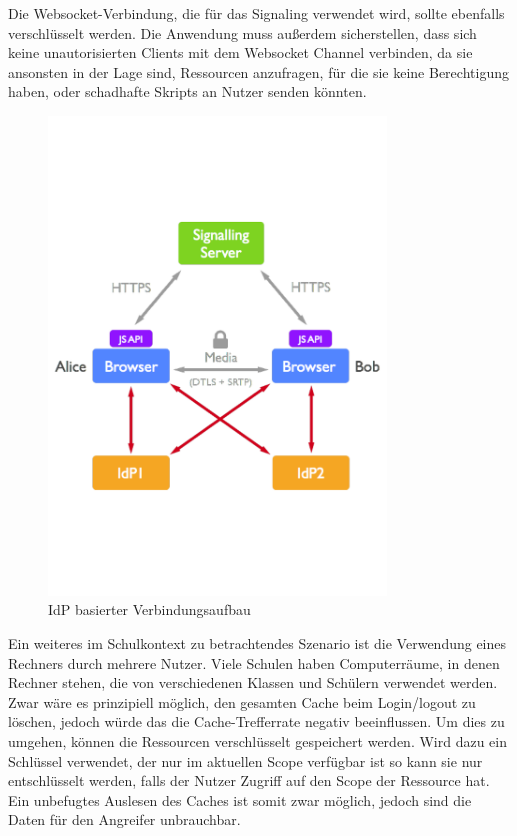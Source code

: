 Die Websocket-Verbindung, die für das Signaling verwendet wird, sollte ebenfalls verschlüsselt werden. Die Anwendung muss außerdem sicherstellen, dass sich keine unautorisierten Clients mit dem Websocket Channel verbinden, da sie ansonsten in der Lage sind, Ressourcen anzufragen, für die sie keine Berechtigung haben, oder schadhafte Skripts an Nutzer senden könnten.

\begin{figure}[!h]
	\centering
	\includegraphics[width=0.8\textwidth]{figures/user_auth}
	\caption[IdP basierter Verbindungsaufbau\cite{rtcweb-security}]{IdP basierter Verbindungsaufbau\cite{rtcweb-security}}
	\label{fig:user_auth}
\end{figure}

Ein weiteres im Schulkontext zu betrachtendes Szenario ist die Verwendung eines Rechners durch mehrere Nutzer. Viele Schulen haben Computerräume, in denen Rechner stehen, die von verschiedenen Klassen und Schülern verwendet werden. Zwar wäre es prinzipiell möglich, den gesamten Cache beim Login/logout zu löschen, jedoch würde das die Cache-Trefferrate negativ beeinflussen. Um dies zu umgehen, können die Ressourcen verschlüsselt gespeichert werden. Wird dazu ein Schlüssel verwendet, der nur im aktuellen Scope verfügbar ist so kann sie nur entschlüsselt werden, falls der Nutzer Zugriff auf den Scope der Ressource hat. Ein unbefugtes Auslesen des Caches ist somit zwar möglich, jedoch sind die Daten für den Angreifer unbrauchbar.

